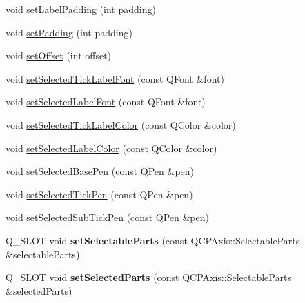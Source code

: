 \begin{DoxyCompactItemize}
void \hyperlink{class_q_c_p_axis_a4391192a766e5d20cfe5cbc17607a7a2}{set\+Label\+Padding} (int padding)
\item 
void \hyperlink{class_q_c_p_axis_a5691441cb3de9e9844855d339c0db279}{set\+Padding} (int padding)
\item 
void \hyperlink{class_q_c_p_axis_a04a652603cbe50eba9969ee6d68873c3}{set\+Offset} (int offset)
\item 
void \hyperlink{class_q_c_p_axis_a845ccb560b7bc5281098a5be494145f6}{set\+Selected\+Tick\+Label\+Font} (const Q\+Font \&font)
\item 
void \hyperlink{class_q_c_p_axis_a02ec2a75d4d8401eaab834fbc6803d30}{set\+Selected\+Label\+Font} (const Q\+Font \&font)
\item 
void \hyperlink{class_q_c_p_axis_a9bdbf5e63ab15187f3a1de9440129227}{set\+Selected\+Tick\+Label\+Color} (const Q\+Color \&color)
\item 
void \hyperlink{class_q_c_p_axis_a5d502dec597c634f491fdd73d151c72d}{set\+Selected\+Label\+Color} (const Q\+Color \&color)
\item 
void \hyperlink{class_q_c_p_axis_aeb917a909215605b95ef2be843de1ee8}{set\+Selected\+Base\+Pen} (const Q\+Pen \&pen)
\item 
void \hyperlink{class_q_c_p_axis_a8360502685eb782edbf04019c9345cdc}{set\+Selected\+Tick\+Pen} (const Q\+Pen \&pen)
\item 
void \hyperlink{class_q_c_p_axis_a2a00a7166600155eac26843132eb9576}{set\+Selected\+Sub\+Tick\+Pen} (const Q\+Pen \&pen)
\item 
Q\+\_\+\+S\+L\+OT void {\bfseries set\+Selectable\+Parts} (const Q\+C\+P\+Axis\+::\+Selectable\+Parts \&selectable\+Parts)\hypertarget{class_q_c_p_axis_ab2d5ab07ad9e7f0e5529e1fb5d00712e}{}\label{class_q_c_p_axis_ab2d5ab07ad9e7f0e5529e1fb5d00712e}

\item 
Q\+\_\+\+S\+L\+OT void {\bfseries set\+Selected\+Parts} (const Q\+C\+P\+Axis\+::\+Selectable\+Parts \&selected\+Parts)\hypertarget{class_q_c_p_axis_a816a132715d851b7016c9740b880464c}{}\label{class_q_c_p_axis_a816a132715d851b7016c9740b880464c}


\end{DoxyCompactItemize}
